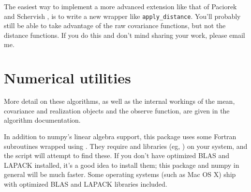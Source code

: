 \documentclass[]{manual}
\begin{document}
The easiest way to implement a more advanced extension like that of Paciorek and Schervish \cite{pachische} , is to write a new wrapper like \texttt{apply_distance}. You'll probably still be able to take advantage of the raw covariance functions, but not the distance functions. If you do this and don't mind sharing your work, please email me.



\chapter{Numerical utilities}\label{cha:numerics} %

More detail on these algorithms, as well as the internal workings of the mean, covariance and realization objects and the observe function, are given in the algorithm documentation.

In addition to numpy's linear algebra support, this package uses some Fortran subroutines wrapped using . They require  and  libraries (eg, ) on your system, and the  script will attempt to find these. If you don't have optimized BLAS and LAPACK installed, it's a good idea to install them; this package and numpy in general will be much faster. Some operating systems (such as Mac OS X) ship with optimized BLAS and LAPACK libraries included.
\end{document}
